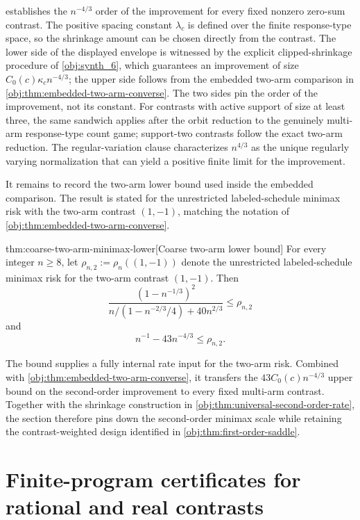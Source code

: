 \documentclass[11pt]{article}
\begin{document}
 establishes the \(n^{-4/3}\) order of the improvement for every fixed nonzero zero-sum contrast. The positive spacing constant \(\lambda_c\) is defined over the finite response-type space, so the shrinkage amount can be chosen directly from the contrast. The lower side of the displayed envelope is witnessed by the explicit clipped-shrinkage procedure of \cref{obj:synth_6}, which guarantees an improvement of size \(C_0(c)\kappa_c n^{-4/3}\); the upper side follows from the embedded two-arm comparison in \cref{obj:thm:embedded-two-arm-converse}. The two sides pin the order of the improvement, not its constant. For contrasts with active support of size at least three, the same sandwich applies after the orbit reduction to the genuinely multi-arm response-type count game; support-two contrasts follow the exact two-arm reduction. The regular-variation clause characterizes \(n^{4/3}\) as the unique regularly varying normalization that can yield a positive finite limit for the improvement.

It remains to record the two-arm lower bound used inside the embedded comparison. The result is stated for the unrestricted labeled-schedule minimax risk with the two-arm contrast \((1,-1)\), matching the notation of \cref{obj:thm:embedded-two-arm-converse}.

\begin{theoremv}{thm:coarse-two-arm-minimax-lower}[Coarse two-arm lower bound]
For every integer \(n\ge 8\), let \(\rho_{n,2}:=\rho_n((1,-1))\) denote the unrestricted labeled-schedule minimax risk for the two-arm contrast \((1,-1)\). Then
\[
\frac{(1-n^{-1/3})^2}
{n/(1-n^{-2/3}/4)+40n^{2/3}}
\le \rho_{n,2}
\]
and
\[
n^{-1}-43n^{-4/3}\le \rho_{n,2}.
\]
\end{theoremv}

The bound supplies a fully internal rate input for the two-arm risk. Combined with \cref{obj:thm:embedded-two-arm-converse}, it transfers the \(43C_0(c)n^{-4/3}\) upper bound on the second-order improvement to every fixed multi-arm contrast. Together with the shrinkage construction in \cref{obj:thm:universal-second-order-rate}, the section therefore pins down the second-order minimax scale while retaining the contrast-weighted design identified in \cref{obj:thm:first-order-saddle}.


\section{Finite-program certificates for rational and real contrasts}\label{sec:programs}
\end{document}
